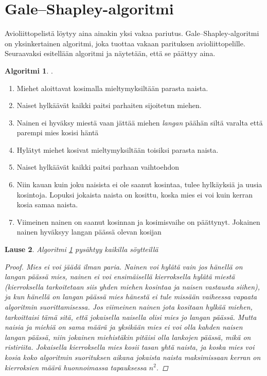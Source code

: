 \documentclass[finnish]{tktltiki2}
\newtheorem{lau}{Lause}
\theoremstyle{definition}
\newtheorem{alg}[lau]{Algoritmi}
\theoremstyle{remark}
\begin{document}
\section{Gale--Shapley-algoritmi}
Avioliittopelistä löytyy aina ainakin yksi vakaa pariutus. Gale--Shapley-algoritmi on yksinkertainen algoritmi, joka tuottaa vakaan parituksen avioliittopelille. Seuraavaksi esitellään algoritmi ja näytetään, että se päättyy aina.
\begin{alg} \cite[s. 13]{gale62a} \label{gsalg}.
\begin{enumerate}
	\item Miehet aloittavat kosimalla mieltymyksiltään parasta naista.
	\item Naiset hylkäävät kaikki paitsi parhaiten sijoitetun miehen.
	\item Nainen ei hyväksy miestä vaan jättää miehen \emph{langan} päähän siltä varalta että parempi mies kosisi häntä
	\item Hylätyt miehet kosivat mieltymyksiltään toisiksi parasta naista.
	\item Naiset hylkäävät kaikki paitsi parhaan vaihtoehdon
	\item Niin kauan kuin joku naisista ei ole saanut kosintaa, tulee hylkäyksiä ja uusia kosintoja. Lopuksi jokaista naista on kosittu, koska mies ei voi kuin kerran kosia samaa naista.
	\item Viimeinen nainen on saanut kosinnan ja kosimisvaihe on päättynyt. Jokainen nainen hyväksyy langan päässä olevan kosijan
\end{enumerate}
\end{alg}


\begin{lau}
Algoritmi \ref{gsalg} pysähtyy kaikilla söytteillä
\begin{proof}
Mies ei voi jäädä ilman paria. Nainen voi hylätä vain jos hänellä on langan päässä mies, nainen ei voi ensimäisellä kierroksella hylätä miestä (kierroksella tarkoitetaan siis yhden miehen kosintaa ja naisen vastausta siihen), ja kun hänellä on langan päässä mies hänestä ei tule missään vaiheessa vapaata algoritmin suorittamisessa.
Jos viimeinen nainen jota kositaan hylkää miehen, tarkoittaisi tämä sitä, että jokaisella naisella olisi mies jo langan päässä. Mutta naisia ja miehiä on sama määrä ja yksikään mies ei voi olla kahden naisen langan päässä, niin jokainen miehistäkin pitäisi olla lankojen päässä, mikä on ristiriita.
Jokaisella kierroksella mies kosii tasan yhtä naista, ja koska mies voi kosia koko algoritmin suorituksen aikana jokaista naista maksimissaan kerran on kierroksien määrä huonnoimassa tapauksessa $n^2$.
\end{proof}
\end{lau}
\end{document}
